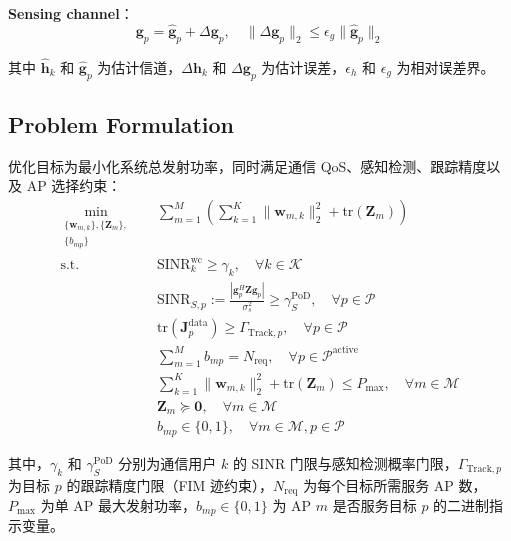 \documentclass[12pt,a4paper]{article}
\newcommand{\vect}[1]{\mathbf{#1}}
\newcommand{\mat}[1]{\mathbf{#1}}
\newcommand{\norm}[1]{\|#1\|_2}
\newcommand{\tr}{\text{tr}}
\begin{document}
\textbf{Sensing channel}：
\begin{equation}
\vect{g}_p = \hat{\vect{g}}_p + \Delta\vect{g}_p, \quad \norm{\Delta\vect{g}_p} \leq \epsilon_g \norm{\hat{\vect{g}}_p}
\end{equation}

其中 $\hat{\vect{h}}_k$ 和 $\hat{\vect{g}}_p$ 为估计信道，$\Delta\vect{h}_k$ 和 $\Delta\vect{g}_p$ 为估计误差，$\epsilon_h$ 和 $\epsilon_g$ 为相对误差界。

\subsection{Problem Formulation}

优化目标为最小化系统总发射功率，同时满足通信 QoS、感知检测、跟踪精度以及 AP 选择约束：
\begin{align}
\min_{\substack{\{\vect{w}_{m,k}\}, \{\mat{Z}_m\}, \\ \{b_{mp}\}}} \quad & \sum_{m=1}^{M} \left( \sum_{k=1}^{K} \norm{\vect{w}_{m,k}}^2 + \tr(\mat{Z}_m) \right) \tag{P1} \\
\text{s.t.} \quad & \text{SINR}_k^{\text{wc}} \geq \gamma_k, \quad \forall k \in \mathcal{K} \label{eq:sinr_comm} \\
& \text{SINR}_{S,p} := \frac{|\vect{g}_p^H \mat{Z} \vect{g}_p|}{\sigma_s^2} \geq \gamma_S^{\text{PoD}}, \quad \forall p \in \mathcal{P} \label{eq:sinr_sens} \\
& \tr(\mat{J}_p^{\text{data}}) \geq \Gamma_{\text{Track}, p}, \quad \forall p \in \mathcal{P} \label{eq:pcrb} \\
& \sum_{m=1}^{M} b_{mp} = N_{\text{req}}, \quad \forall p \in \mathcal{P}^{\text{active}} \label{eq:ap_select} \\
& \sum_{k=1}^{K} \norm{\vect{w}_{m,k}}^2 + \tr(\mat{Z}_m) \leq P_{\max}, \quad \forall m \in \mathcal{M} \label{eq:power} \\
& \mat{Z}_m \succeq \mat{0}, \quad \forall m \in \mathcal{M} \label{eq:psd} \\
& b_{mp} \in \{0, 1\}, \quad \forall m \in \mathcal{M}, p \in \mathcal{P} \label{eq:binary}
\end{align}

其中，$\gamma_k$ 和 $\gamma_S^{\text{PoD}}$ 分别为通信用户 $k$ 的 SINR 门限与感知检测概率门限，$\Gamma_{\text{Track},p}$ 为目标 $p$ 的跟踪精度门限（FIM 迹约束），$N_{\text{req}}$ 为每个目标所需服务 AP 数，$P_{\max}$ 为单 AP 最大发射功率，$b_{mp} \in \{0,1\}$ 为 AP $m$ 是否服务目标 $p$ 的二进制指示变量。
\end{document}
